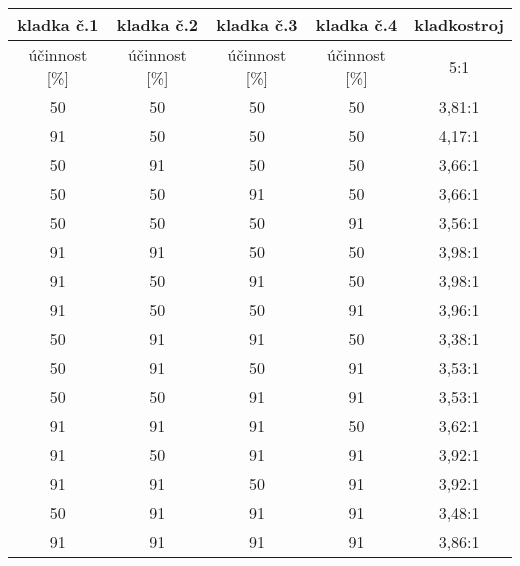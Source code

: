 \begin{table}[h!]
    \begin{tabular}{|c|c|c|c|c|}
        \hline
        kladka č.1 & kladka č.2 & kladka č.3 & kladka č.4 & kladkostroj \\ \hline
        {účinnost [}\%{]}   & {účinnost [}\%{]}   & {účinnost [}\%{]}   & {účinnost [}\%{]}   & 5:1         \\ \hline
        50                  & 50                  & 50                  & 50                  & 3,81:1      \\ \hline
        91                  & 50                  & 50                  & 50                  & 4,17:1      \\ \hline
        50                  & 91                  & 50                  & 50                  & 3,66:1      \\ \hline
        50                  & 50                  & 91                  & 50                  & 3,66:1      \\ \hline
        50                  & 50                  & 50                  & 91                  & 3,56:1      \\ \hline
        91                  & 91                  & 50                  & 50                  & 3,98:1      \\ \hline
        91                  & 50                  & 91                  & 50                  & 3,98:1      \\ \hline
        91                  & 50                  & 50                  & 91                  & 3,96:1      \\ \hline
        50                  & 91                  & 91                  & 50                  & 3,38:1      \\ \hline
        50                  & 91                  & 50                  & 91                  & 3,53:1      \\ \hline
        50                  & 50                  & 91                  & 91                  & 3,53:1      \\ \hline
        91                  & 91                  & 91                  & 50                  & 3,62:1      \\ \hline
        91                  & 50                  & 91                  & 91                  & 3,92:1      \\ \hline
        91                  & 91                  & 50                  & 91                  & 3,92:1      \\ \hline
        50                  & 91                  & 91                  & 91                  & 3,48:1      \\ \hline
        91                  & 91                  & 91                  & 91                  & 3,86:1      \\ \hline
    \end{tabular}
\end{table}
\newpage
